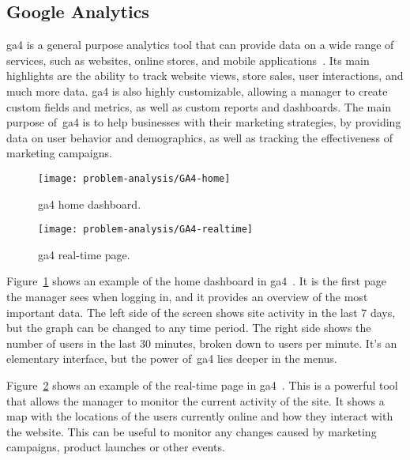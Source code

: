 \subsection{Google Analytics}\label{subsec:google-analytics}

\acrfull{ga4} is a general purpose analytics tool that can provide data on a wide range of services, such as websites,
online stores, and mobile applications~\cite{ga4}.
Its main highlights are the ability to track website views, store sales, user interactions, and much more data.
\acrshort{ga4} is also highly customizable, allowing a manager to create custom fields and metrics, as well as custom
reports and dashboards.
The main purpose of~\acrshort{ga4} is to help businesses with their marketing strategies, by providing data on user
behavior and demographics, as well as tracking the effectiveness of marketing campaigns.

\begin{figure}[H]
    \centering
    \texttt{[image: problem-analysis/GA4-home]}
    \caption{\acrshort{ga4} home dashboard.
    }\label{fig:GA4-dashboard}
\end{figure}

\begin{figure}[H]
    \centering
    \texttt{[image: problem-analysis/GA4-realtime]}
    \caption{\acrshort{ga4} real-time page.
    }\label{fig:GA4-realtime}
\end{figure}

Figure~\ref{fig:GA4-dashboard} shows an example of the home dashboard in \acrshort{ga4}~\cite{ga4-interface}.
It is the first page the manager sees when logging in, and it provides an overview of the most important data.
The left side of the screen shows site activity in the last 7 days, but the graph can be changed to any time period.
The right side shows the number of users in the last 30 minutes, broken down to users per minute.
It's an elementary interface, but the power of~\acrshort{ga4} lies deeper in the menus.

Figure~\ref{fig:GA4-realtime} shows an example of the real-time page in \acrshort{ga4}~\cite{ga4-realtime}.
This is a powerful tool that allows the manager to monitor the current activity of the site.
It shows a map with the locations of the users currently online and how they interact with the website.
This can be useful to monitor any changes caused by marketing campaigns, product launches or other events.


